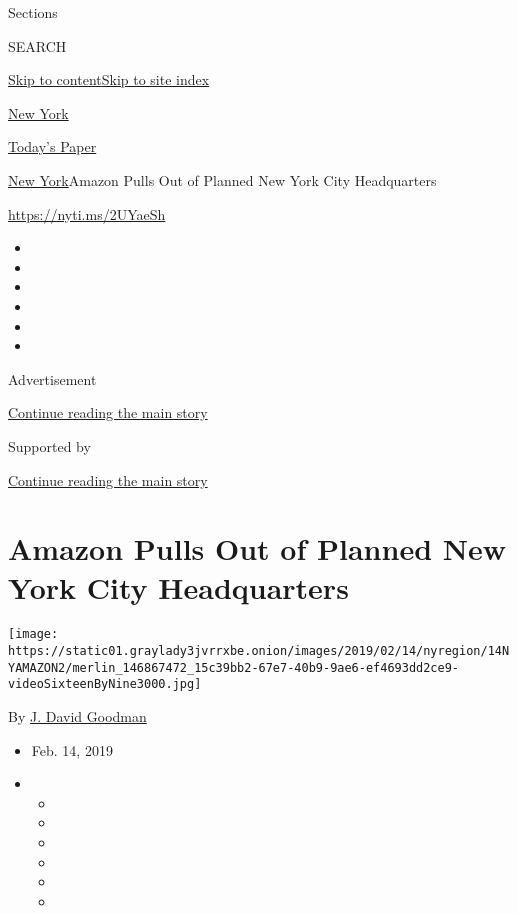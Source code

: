 Sections

SEARCH

\protect\hyperlink{site-content}{Skip to
content}\protect\hyperlink{site-index}{Skip to site index}

\href{https://www.nytimes3xbfgragh.onion/section/nyregion}{New York}

\href{https://myaccount.nytimes3xbfgragh.onion/auth/login?response_type=cookie\&client_id=vi}{}

\href{https://www.nytimes3xbfgragh.onion/section/todayspaper}{Today's
Paper}

\href{/section/nyregion}{New York}\textbar{}Amazon Pulls Out of Planned
New York City Headquarters

\url{https://nyti.ms/2UYaeSh}

\begin{itemize}
\item
\item
\item
\item
\item
\item
\end{itemize}

Advertisement

\protect\hyperlink{after-top}{Continue reading the main story}

Supported by

\protect\hyperlink{after-sponsor}{Continue reading the main story}

\hypertarget{amazon-pulls-out-of-planned-new-york-city-headquarters}{%
\section{Amazon Pulls Out of Planned New York City
Headquarters}\label{amazon-pulls-out-of-planned-new-york-city-headquarters}}

\texttt{[image: https://static01.graylady3jvrrxbe.onion/images/2019/02/14/nyregion/14NYAMAZON2/merlin\_146867472\_15c39bb2-67e7-40b9-9ae6-ef4693dd2ce9-videoSixteenByNine3000.jpg]}

By \href{https://www.nytimes3xbfgragh.onion/by/j-david-goodman}{J. David
Goodman}

\begin{itemize}
\item
  Feb. 14, 2019
\item
  \begin{itemize}
  \item
  \item
  \item
  \item
  \item
  \item
  \end{itemize}
\end{itemize}

